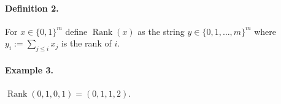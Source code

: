 \paragraph{Definition 2.}
For $x\in\{0,1\}^m$ define $\operatorname{Rank}(x)$ as the string $y\in\{0,1,\ldots,m\}^m$ where $y_i:=\sum_{j\leq i}x_j$ is the rank of $i$.
\paragraph{Example 3.}
$\operatorname{Rank}(0,1,0,1)=(0,1,1,2)$.
